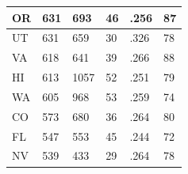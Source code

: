 \begin{table}[htbp]
\begin{tabular}{|l|l|l|l|l|l|}
OR &       631 &       693 &        46 &      .256 &        87 \\ \hline 
UT &       631 &       659 &        30 &      .326 &        78 \\ \hline 
VA &       618 &       641 &        39 &      .266 &        88 \\ \hline 
HI &       613 &      1057 &        52 &      .251 &        79 \\ \hline 
WA &       605 &       968 &        53 &      .259 &        74 \\ \hline 
CO &       573 &       680 &        36 &      .264 &        80 \\ \hline 
FL &       547 &       553 &        45 &      .244 &        72 \\ \hline 
NV &       539 &       433 &        29 &      .264 &        78 \\ \hline 
  \end{tabular}
\end{table}
